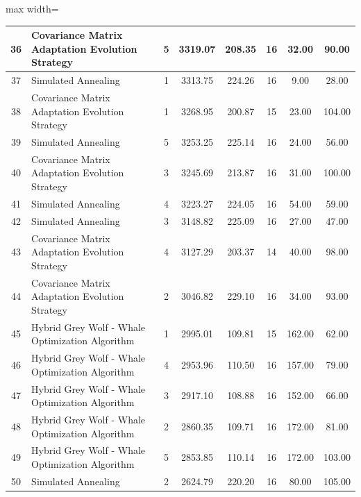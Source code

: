 \documentclass[Afour,sagev,times]{sagej}
\begin{document}
\begin{table}[htbp]
\begin{adjustbox}{max width=\textwidth}
\begin{tabular}{|c|l|c|c|c|c|c|c|}
36 & Covariance Matrix Adaptation Evolution Strategy & 5 & 3319.07 & 208.35 & 16 & 32.00 & 90.00 \\ \hline
37 & Simulated Annealing & 1 & 3313.75 & 224.26 & 16 & 9.00 & 28.00 \\ \hline
38 & Covariance Matrix Adaptation Evolution Strategy & 1 & 3268.95 & 200.87 & 15 & 23.00 & 104.00 \\ \hline
39 & Simulated Annealing & 5 & 3253.25 & 225.14 & 16 & 24.00 & 56.00 \\ \hline
40 & Covariance Matrix Adaptation Evolution Strategy & 3 & 3245.69 & 213.87 & 16 & 31.00 & 100.00 \\ \hline
41 & Simulated Annealing & 4 & 3223.27 & 224.05 & 16 & 54.00 & 59.00 \\ \hline
42 & Simulated Annealing & 3 & 3148.82 & 225.09 & 16 & 27.00 & 47.00 \\ \hline
43 & Covariance Matrix Adaptation Evolution Strategy & 4 & 3127.29 & 203.37 & 14 & 40.00 & 98.00 \\ \hline
44 & Covariance Matrix Adaptation Evolution Strategy & 2 & 3046.82 & 229.10 & 16 & 34.00 & 93.00 \\ \hline
45 & Hybrid Grey Wolf - Whale Optimization Algorithm & 1 & 2995.01 & 109.81 & 15 & 162.00 & 62.00 \\ \hline
46 & Hybrid Grey Wolf - Whale Optimization Algorithm & 4 & 2953.96 & 110.50 & 16 & 157.00 & 79.00 \\ \hline
47 & Hybrid Grey Wolf - Whale Optimization Algorithm & 3 & 2917.10 & 108.88 & 16 & 152.00 & 66.00 \\ \hline
48 & Hybrid Grey Wolf - Whale Optimization Algorithm & 2 & 2860.35 & 109.71 & 16 & 172.00 & 81.00 \\ \hline
49 & Hybrid Grey Wolf - Whale Optimization Algorithm & 5 & 2853.85 & 110.14 & 16 & 172.00 & 103.00 \\ \hline
50 & Simulated Annealing & 2 & 2624.79 & 220.20 & 16 & 80.00 & 105.00 \\ \hline
\end{tabular}
\end{adjustbox}
\label{tab:execution_data_opti}
\end{table}
\end{document}
